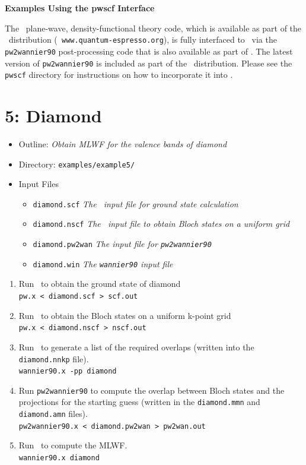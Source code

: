 \documentclass[a4paper,11pt,twoside]{article}
\begin{document}
\cleardoublepage

\begin{center}
\Large{\bf Examples Using the {\sc pwscf} Interface}
\end{center}

The \pwscf\ plane-wave, density-functional theory code, which is
available as part of the \QE\ distribution ({\tt
  www.quantum-espresso.org}), is fully interfaced to \wannier\ via the
{\tt pw2wannier90} post-processing code that is also available as part
of \QE. The latest version of {\tt pw2wannier90} is included as part of 
the \wannier\ distribution. Please see the {\tt pwscf} directory for 
instructions on how to incorporate it into \pwscf. 


\cleardoublepage

\section*{5: Diamond}
\begin{itemize}
\item{Outline: \it{Obtain MLWF for the valence bands of diamond}}
\item{Directory: {\tt examples/example5/}}
\item{Input Files}
\begin{itemize}
\item{ {\tt diamond.scf}  {\it The \pwscf\ input file for ground state
    calculation}} 
\item{ {\tt diamond.nscf}  {\it The \pwscf\ input file to obtain Bloch
    states on a uniform grid}} 
\item{ {\tt diamond.pw2wan}  {\it The input file for {\tt pw2wannier90}}}
\item{ {\tt diamond.win}  {\it The {\tt wannier90} input file}}
\end{itemize}
\end{itemize}

\begin{enumerate}
\item Run \pwscf\ to obtain the ground state of diamond\\
{\tt pw.x < diamond.scf > scf.out}

\item Run \pwscf\ to obtain the Bloch states on a uniform k-point grid\\
{\tt pw.x < diamond.nscf > nscf.out}

\item Run \wannier\ to generate a list of the required overlaps (written
  into the {\tt diamond.nnkp} file).\\ 
{\tt wannier90.x -pp diamond}

\item Run {\tt pw2wannier90} to compute the overlap between Bloch
  states and the projections for the starting guess (written in the
  {\tt diamond.mmn} and {\tt diamond.amn} files).\\  
{\tt pw2wannier90.x < diamond.pw2wan > pw2wan.out}

\item Run \wannier\ to compute the MLWF.\\
{\tt wannier90.x diamond}
\end{enumerate}
\end{document}
